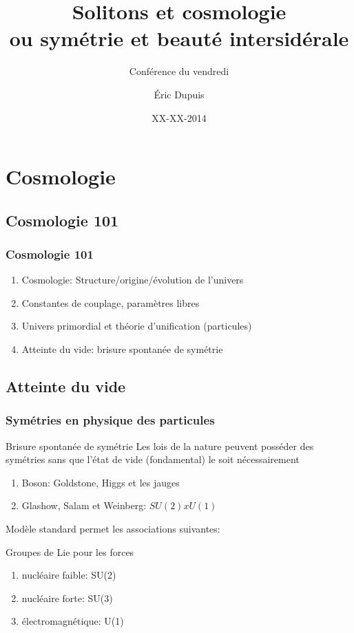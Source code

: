 \documentclass[handout]{beamer}
\title{Solitons et cosmologie\\ ou symétrie et beauté intersidérale}
\subtitle{Conférence du vendredi}
\author{Éric Dupuis}
\institute{Université de Montréal, département de physique des particules}
\date{XX-XX-2014}
\begin{document}
\begin{frame}
\titlepage
\end{frame}
%

\section*{}
\begin{frame}
\tableofcontents
\end{frame}



\section{Cosmologie}
\subsection{Cosmologie 101}
\begin{frame}
\frametitle{Cosmologie 101}
\begin{enumerate}
\item Cosmologie: Structure/origine/évolution de l'univers
\item Constantes de couplage, paramètres libres
\item Univers primordial et théorie d'unification (particules)
\item Atteinte du vide: brisure spontanée de symétrie
\end{enumerate}
\end{frame}


\subsection{Atteinte du vide}
\begin{frame}
\frametitle{Symétries en physique des particules}
\begin{block}{Brisure spontanée de symétrie}
Les lois de la nature peuvent posséder des symétries sans que l'état de vide (fondamental) le soit nécessairement
\begin{enumerate}
\item Boson: Goldstone, Higgs et les jauges
\item Glashow, Salam et Weinberg: $SU(2)xU(1)$ 
\end{enumerate}
\end{block}
Modèle standard permet les associations suivantes:
\begin{block}{Groupes de Lie pour les forces}
\begin{enumerate}
\item nucléaire faible: SU(2)
\item nucléaire forte: SU(3)
\item électromagnétique: U(1)
\end{enumerate}
\end{block}
\end{frame}
\end{document}
